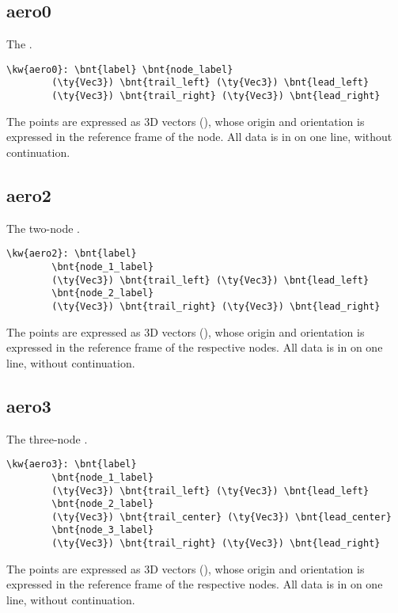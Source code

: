\subsection{aero0}
The .
\begin{Verbatim}[commandchars=\\\{\}]
    \kw{aero0}: \bnt{label} \bnt{node_label}
        (\ty{Vec3}) \bnt{trail_left} (\ty{Vec3}) \bnt{lead_left}
        (\ty{Vec3}) \bnt{trail_right} (\ty{Vec3}) \bnt{lead_right}
\end{Verbatim}
The points are expressed as 3D vectors (), whose origin and orientation
is expressed in the reference frame of the node.
All data is in on one line, without continuation.

\subsection{aero2}
The two-node .
\begin{Verbatim}[commandchars=\\\{\}]
    \kw{aero2}: \bnt{label}
        \bnt{node_1_label}
        (\ty{Vec3}) \bnt{trail_left} (\ty{Vec3}) \bnt{lead_left}
        \bnt{node_2_label}
        (\ty{Vec3}) \bnt{trail_right} (\ty{Vec3}) \bnt{lead_right}
\end{Verbatim}
The points are expressed as 3D vectors (), whose origin and orientation
is expressed in the reference frame of the respective nodes.
All data is in on one line, without continuation.

\subsection{aero3}
The three-node .
\begin{Verbatim}[commandchars=\\\{\}]
    \kw{aero3}: \bnt{label}
        \bnt{node_1_label}
        (\ty{Vec3}) \bnt{trail_left} (\ty{Vec3}) \bnt{lead_left}
        \bnt{node_2_label}
        (\ty{Vec3}) \bnt{trail_center} (\ty{Vec3}) \bnt{lead_center}
        \bnt{node_3_label}
        (\ty{Vec3}) \bnt{trail_right} (\ty{Vec3}) \bnt{lead_right}
\end{Verbatim}
The points are expressed as 3D vectors (), whose origin and orientation
is expressed in the reference frame of the respective nodes.
All data is in on one line, without continuation.

